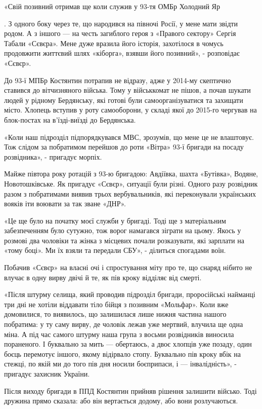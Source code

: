«Свій позивний отримав ще коли служив у 93-тя ОМБр Холодний Яр

. З одного боку через те, що народився на півночі Росії, у мене мати звідти
родом. А з іншого — на честь загиблого героя з «Правого сектору» Сергія Табали
«Сєвєра». Мене дуже вразила його історія, захотілося в чомусь продовжити
життєвий шлях «кіборга», взявши його позивний», - розповідає «Сєвєр».

До 93-ї МПБр Костянтин потрапив не відразу, адже у 2014-му скептично ставився
до вітчизняного війська. Тому у військкомат не пішов, а почав шукати людей у
рідному Бердянську, які готові були самоорганізуватися та захищати місто.
Хлопець вступив у роту самооборони, у складі якої до 2015-го чергував на
блок-постах на в’їзді-виїзді до Бердянська.

«Коли наш підрозділ підпорядкувався МВС, зрозумів, що мене це не влаштовує. Тож
слідом за побратимом перейшов до роти «Вітра» 93-ї бригади на посаду
розвідника», - пригадує морпіх.

Майже півтора року ротацій з 93-ю бригадою: Авдіївка, шахта «Бутівка», Водяне,
Новотошківське. Як пригадує «Сєвєр», ситуації були різні. Одного разу розвідник
разом з побратимами виявив трьох вербувальників, які переконували українських
вояків іти воювати за так зване «ДНР».

«Це ще було на початку моєї служби у бригаді. Тоді ще з матеріальним
забезпеченням було сутужно, тож ворог намагався зіграти на цьому. Якось у
розмові два чоловіки та жінка з місцевих почали розказувати, які зарплати на
«тому боці». Ми їх взяли та передали СБУ», - ділиться спогадами воїн.

Побачив «Сєвєр» на власні очі і спростування міту про те, що снаряд нібито не
влучає в одну вирву двічі й те, як пів кроку відділяє від смерті.


«Після штурму селища, який проводив підрозділ бригади, проросійські найманці
три дні не хотіли віддавати тіло бійця з позивним «Мольфар». Коли вже
домовилися, то виявилось, що залишилася лише нижня частина нашого побратима: у
ту саму вирву, де чоловік лежав уже мертвий, влучила ще одна міна. А під час
самого штурму наша група з восьми розвідників виносила пораненого. І буквально
за мить — обертаюсь, а двоє хлопців уже позаду, один боєць перемотує іншого,
якому відірвало стопу. Буквально пів кроку вбік на стежці, по якій ми до того
пів дня носили боєприпаси, і — інвалідність», - пригадує захисник України.

Після виходу бригади в ППД Костянтин прийняв рішення залишити військо. Тоді
дружина прямо сказала: або він вертається додому, або вони розлучаються.

